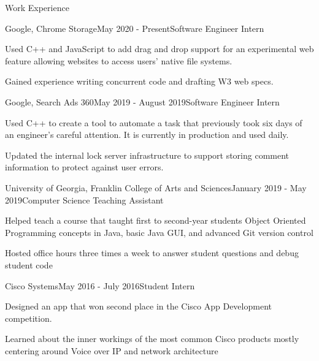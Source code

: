 \documentclass{resume} %
\begin{document}
\begin{rSection}{Work Experience}

\begin{rSubsection}{Google, Chrome Storage}{May 2020 - Present}{Software Engineer Intern}{}
\item Used C++ and JavaScript to add drag and drop support for an experimental web feature allowing websites
    to access users' native file systems.
\item Gained experience writing concurrent code and drafting W3 web specs.
\end{rSubsection}

\begin{rSubsection}{Google, Search Ads 360}{May 2019 - August 2019}{Software Engineer Intern}{}
\item Used C++ to create a tool to automate
      a task that previously took six days of an engineer's careful attention. It is currently in production and used daily.
\item Updated the internal lock server infrastructure to support storing comment information 
      to protect against user errors.
\end{rSubsection}


\begin{rSubsection}{University of Georgia, Franklin College of Arts and Sciences}{January 2019 - May 2019}{Computer Science Teaching Assistant}{}
\item Helped teach a course that taught first to second-year students Object Oriented Programming concepts in Java, basic Java GUI, and advanced Git version control

\item Hosted office hours three times a week to answer student questions and debug student code

\end{rSubsection}

\begin{rSubsection}{Cisco Systems}{May 2016 - July 2016}{Student Intern}{}
\item Designed an app that won second place in the Cisco App Development competition.

\item Learned about the inner workings of the most common Cisco products mostly centering around Voice over IP and network architecture
    
\end{rSubsection}

\end{rSection}
\end{document}
